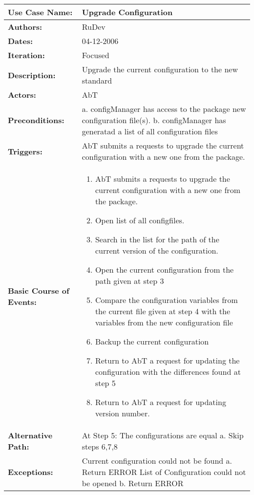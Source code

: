 \begin{tabularx}{\linewidth}{|l|X|}
\hline
\textbf{Use Case Name:} & \textbf{Upgrade Configuration} \\
\hline
\textbf{Authors:} & RuDev \\
\hline
\textbf{Dates:} & 04-12-2006 \\
\hline
\textbf{Iteration:} & Focused \\
\hline
\textbf{Description:} & Upgrade the current configuration to the new standard \\
\hline
\textbf{Actors:} & AbT \\
\hline
\textbf{Preconditions:} & a. configManager has access to the package new configuration file(s). \newline b. configManager has generatad a list of all configuration files \\
\hline
\textbf{Triggers:} & AbT submits a requests to upgrade the current configuration with a new one from the package. \\
\hline
\textbf{Basic Course of Events:} & 
\begin{minipage}{\linewidth} 
  \vspace{0.05em}
  \begin{enumerate}
   \item AbT submits a requests to upgrade the current configuration with a new one from the package.
   \item Open list of all configfiles.
   \item Search in the list for the path of the current version of the configuration.
   \item Open the current configuration from the path given at step 3
   \item Compare the configuration variables from the current file given at step 4 with the variables from the new configuration file
   \item Backup the current configuration
   \item Return to AbT a request for updating the configuration with the differences found at step 5
   \item Return to AbT a request for updating version number.
  \end{enumerate}
  \vspace{0.05em}
\end{minipage}
\\
\hline 
\textbf{Alternative Path:} & At Step 5: The configurations are equal \newline a. Skip steps 6,7,8  \\
\hline
\textbf{Exceptions:} & Current configuration could not be found \newline a. Return ERROR \newline\newline List of Configuration could not be opened \newline b. Return ERROR\\
\hline
\end{tabularx}
